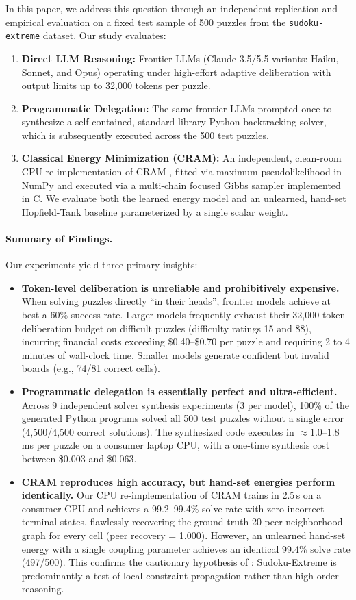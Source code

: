 \documentclass{article} %
\begin{document}
In this paper, we address this question through an independent replication and empirical evaluation on a fixed test sample of 500 puzzles from the \texttt{sudoku-extreme} dataset. Our study evaluates:
\begin{enumerate}
    \item \textbf{Direct LLM Reasoning:} Frontier LLMs (Claude 3.5/5.5 variants: Haiku, Sonnet, and Opus) operating under high-effort adaptive deliberation with output limits up to 32,000 tokens per puzzle.
    \item \textbf{Programmatic Delegation:} The same frontier LLMs prompted once to synthesize a self-contained, standard-library Python backtracking solver, which is subsequently executed across the 500 test puzzles.
    \item \textbf{Classical Energy Minimization (CRAM):} An independent, clean-room CPU re-implementation of CRAM \citep{hoover2026classical}, fitted via maximum pseudolikelihood in NumPy and executed via a multi-chain focused Gibbs sampler implemented in C. We evaluate both the learned energy model and an unlearned, hand-set Hopfield-Tank baseline parameterized by a single scalar weight.
\end{enumerate}

\paragraph{Summary of Findings.} Our experiments yield three primary insights:
\begin{itemize}
    \item \textbf{Token-level deliberation is unreliable and prohibitively expensive.} When solving puzzles directly ``in their heads'', frontier models achieve at best a 60\% success rate. Larger models frequently exhaust their 32,000-token deliberation budget on difficult puzzles (difficulty ratings 15 and 88), incurring financial costs exceeding \$0.40--\$0.70 per puzzle and requiring 2 to 4 minutes of wall-clock time. Smaller models generate confident but invalid boards (e.g., 74/81 correct cells).
    \item \textbf{Programmatic delegation is essentially perfect and ultra-efficient.} Across 9 independent solver synthesis experiments (3 per model), 100\% of the generated Python programs solved all 500 test puzzles without a single error (4,500/4,500 correct solutions). The synthesized code executes in $\approx 1.0$--$1.8$\,ms per puzzle on a consumer laptop CPU, with a one-time synthesis cost between \$0.003 and \$0.063.
    \item \textbf{CRAM reproduces high accuracy, but hand-set energies perform identically.} Our CPU re-implementation of CRAM trains in 2.5\,s on a consumer CPU and achieves a 99.2--99.4\% solve rate with zero incorrect terminal states, flawlessly recovering the ground-truth 20-peer neighborhood graph for every cell (peer recovery = 1.000). However, an unlearned hand-set energy with a single coupling parameter achieves an identical 99.4\% solve rate (497/500). This confirms the cautionary hypothesis of \citet{hoover2026classical}: Sudoku-Extreme is predominantly a test of local constraint propagation rather than high-order reasoning.
\end{itemize}
\end{document}
